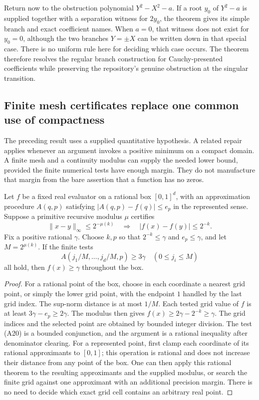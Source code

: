 Return now to the obstruction polynomial \(Y^2-X^2-a\). If a root
\(y_0\) of \(Y^2-a\) is supplied together with a separation witness
for \(2y_0\), the theorem gives its simple branch and exact
coefficient names. When \(a=0\), that witness does not exist for
\(y_0=0\), although the two branches \(Y=\pm X\) can be written
down in that special case. There is no uniform rule here for deciding
which case occurs. The theorem therefore resolves the regular branch
construction for Cauchy-presented coefficients while preserving the
repository's genuine obstruction at the singular transition.

\subsection{Finite mesh certificates replace one common use of compactness}
\label{sec:mesh-certificates}

The preceding result uses a supplied quantitative hypothesis. A related
repair applies whenever an argument invokes a positive minimum on a
compact domain. A finite mesh and a continuity modulus can supply the
needed lower bound, provided the finite numerical tests have enough
margin. They do not manufacture that margin from the bare assertion
that a function has no zeros.

\begin{proposition}
\label{prop:mesh-positivity}
Let \(f\) be a fixed real evaluator on a rational box
\([0,1]^d\), with an approximation procedure \(A(q,p)\) satisfying
\(|A(q,p)-f(q)|\leq e_p\) in the represented sense. Suppose a
primitive recursive modulus \(\mu\) certifies
\[
 \lVert x-y\rVert_\infty\leq2^{-\mu(k)}
       \quad\Longrightarrow\quad
 |f(x)-f(y)|\leq2^{-k}.
\]
Fix a positive rational \(\gamma\). Choose \(k,p\) so that
\(2^{-k}\leq\gamma\) and \(e_p\leq\gamma\), and let
\(M=2^{\mu(k)}\). If the finite tests
\[
 A(j_1/M,\ldots,j_d/M,p)\geq3\gamma
       \quad(0\leq j_i\leq M)
 \tag{A20}\label{eq:mesh-certificate}
\]
all hold, then \(f(x)\geq\gamma\) throughout the box.
\end{proposition}
\begin{proof}
For a rational point of the box, choose in each coordinate a nearest
grid point, or simply the lower grid point, with the endpoint \(1\)
handled by the last grid index. The sup-norm distance is at most
\(1/M\). Each tested grid value of \(f\) is at least
\(3\gamma-e_p\geq2\gamma\). The modulus then gives
\(f(x)\geq2\gamma-2^{-k}\geq\gamma\).
The grid indices and the selected point are obtained by bounded
integer division. The test (A20) is a bounded conjunction, and the
argument is a rational inequality after denominator clearing.
For a represented point, first clamp each coordinate of its rational
approximants to \([0,1]\); this operation is rational and does not
increase their distance from any point of the box. One can then apply
this rational theorem to the resulting approximants and the supplied modulus,
or search the finite grid against one approximant with an additional
precision margin. There is no need to decide which exact grid cell
contains an arbitrary real point.
\end{proof}

